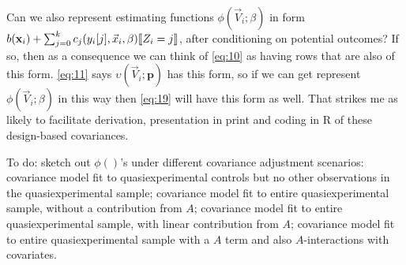 \documentclass{article}
\DeclarePairedDelimiter{\indicator}{\llbracket}{\rrbracket}
\newcommand{\absorbInterceptsEF}{\upsilon}
\begin{document}
Can we also represent estimating functions
$\phi(\vec{V}_{i}; \beta)$ in form
$b(\mathbf{x}_{i}) + \sum_{j=0}^{k}c_{j}(y_{i}[j], \vec{x}_{i}, \beta)\indicator{Z_{i}=j}$, after conditioning
on potential outcomes? If so, then as a consequence we can think of
\eqref{eq:10} as having rows that are also of this form.
\eqref{eq:11} says $\absorbInterceptsEF(\vec{V}_{i}; \mathbf{p})$
has this form, so if we can get represent
$\phi(\vec{V}_{i}; \beta)$ in this way then \eqref{eq:19}
will have this form as well. That strikes me as likely to facilitate
derivation, 
presentation in print and coding in R of these design-based covariances. 

To do:
sketch out $\phi()$'s under different covariance adjustment scenarios:
covariance model fit to quasiexperimental controls but no other
observations in the quasiexperimental sample; covariance model fit to
entire quasiexperimental sample, without a contribution from $A$;
covariance model fit to entire quasiexperimental sample, with linear
contribution from $A$; covariance model fit to entire
quasiexperimental sample with a $A$ term and also $A$-interactions
with covariates.

\end{document}
